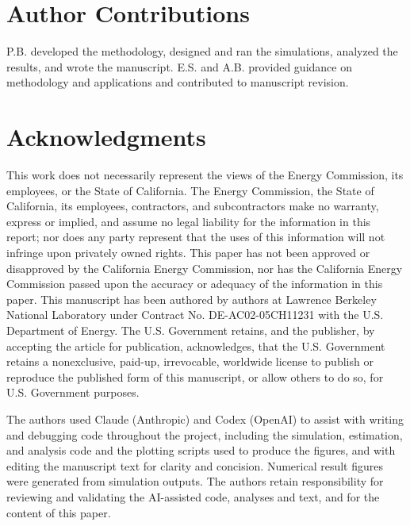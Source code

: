 \documentclass[numsec,webpdf,modern,mediumone]{oup-authoring-template}
\begin{document}
\section*{Author Contributions}

P.B. developed the methodology, designed and ran the simulations, analyzed the results, and wrote the manuscript. E.S. and A.B. provided guidance on methodology and applications and contributed to manuscript revision.

\section*{Acknowledgments}

This work does not necessarily represent the views of the Energy Commission, its employees, or the State of California. The Energy Commission, the State of California, its employees, contractors, and subcontractors make no warranty, express or implied, and assume no legal liability for the information in this report; nor does any party represent that the uses of this information will not infringe upon privately owned rights. This paper has not been approved or disapproved by the California Energy Commission, nor has the California Energy Commission passed upon the accuracy or adequacy of the information in this paper. This manuscript has been authored by authors at Lawrence Berkeley National Laboratory under Contract No. DE-AC02-05CH11231 with the U.S. Department of Energy. The U.S. Government retains, and the publisher, by accepting the article for publication, acknowledges, that the U.S. Government retains a nonexclusive, paid-up, irrevocable, worldwide license to publish or reproduce the published form of this manuscript, or allow others to do so, for U.S. Government purposes.

The authors used Claude (Anthropic) and Codex (OpenAI) to assist with writing and debugging code throughout the project, including the simulation, estimation, and analysis code and the plotting scripts used to produce the figures, and with editing the manuscript text for clarity and concision. Numerical result figures were generated from simulation outputs. The authors retain responsibility for reviewing and validating the AI-assisted code, analyses and text, and for the content of this paper.



\end{document}
